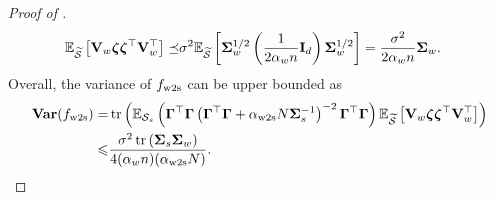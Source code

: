 \begin{proof}[Proof of ]
\begin{align*}
        \E_{\wt\Scal}\sbr{\Vb_w \zetab \zetab^\top \Vb_w^\top} 
        \preceq &\sigma^2 \E_{\wt\Scal}\sbr{\Sigmab_w^{1/2} \rbr{\frac{1}{2 \alpha_w n} \Ib_d} \Sigmab_w^{1/2}}
        = \frac{\sigma^2}{2 \alpha_w n} \Sigmab_w.
    \end{align*}
    Overall, the variance of $f_\wts$ can be upper bounded as
    \begin{align}\label{eq:pf_ridge_var_ub}
    \begin{split}
        \vari(f_\wts) 
        = &\tr\rbr{\E_{\Scal_s}\rbr{\Gammab^\top \Gammab \rbr{\Gammab^\top \Gammab + \alpha_\wts N \Sigmab_s^{-1}}^{-2} \Gammab^\top \Gammab} \E_{\wt\Scal}\sbr{\Vb_w \zetab \zetab^\top \Vb_w^\top}} \\
        \le &\frac{\sigma^2 \tr\rbr{\Sigmab_s \Sigmab_w}}{4 (\alpha_w n) (\alpha_\wts N)}.
    \end{split}
    \end{align}


\end{proof}
